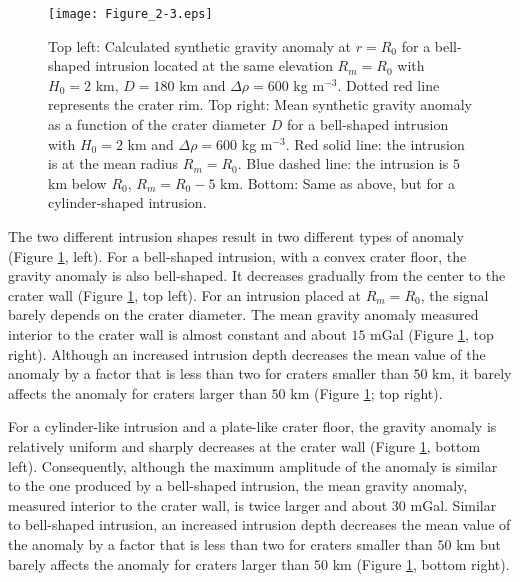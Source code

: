 \begin{figure}[h!]
  \graphicspath{ {/Users/thorey/Documents/These/Projet/FFC/Gravi_GRAIL/Article/Papier/Proof/} }
  \begin{center}
    \texttt{[image: Figure\_2-3.eps]}
    \caption{Top left:  Calculated synthetic gravity anomaly  at $r=R_0$
      for  a  bell-shaped  intrusion   located  at  the  same  elevation
      $R_m=R_0$ with $H_0 = 2$ km, $D  = 180$ km and $\Delta \rho = 600$
      kg m$^{-3}$. Dotted red line represents the crater rim. Top right:
      Mean  synthetic  gravity  anomaly  as a  function  of  the  crater
      diameter $D$  for a bell-shaped  intrusion with  $H_0 = 2$  km and
      $\Delta \rho = 600$ kg m$^{-3}$.  Red solid line: the intrusion is
      at the mean  radius $R_m=R_0$. Blue dashed line:  the intrusion is
      $5$ km below  $R_0$, $R_m = R_0-5$ km. Bottom:  Same as above, but
      for a cylinder-shaped intrusion.}
    \label{C6-Figure2-3}
  \end{center}



\end{figure}

The two  different intrusion shapes  result in two different  types of
anomaly   (Figure  \ref{C6-Figure2-3},   left).   For   a  bell-shaped
intrusion, with  a convex  crater floor, the  gravity anomaly  is also
bell-shaped.  It  decreases gradually  from the  center to  the crater
wall (Figure  \ref{C6-Figure2-3}, top left).  For  an intrusion placed
at $R_m=R_0$, the  signal barely depends on the  crater diameter.  The
mean gravity  anomaly measured interior  to the crater wall  is almost
constant and  about $15$ mGal (Figure  \ref{C6-Figure2-3}, top right).
Although an increased intrusion depth  decreases the mean value of the
anomaly by  a factor that  is less than  two for craters  smaller than
$50$ km, it barely affects the anomaly for craters larger than $50$ km
(Figure \ref{C6-Figure2-3}; top right).

For  a cylinder-like  intrusion  and a  plate-like  crater floor,  the
gravity anomaly  is relatively  uniform and  sharply decreases  at the
crater  wall  (Figure  \ref{C6-Figure2-3}, bottom  left).   Consequently,
although the  maximum amplitude of the  anomaly is similar to  the one
produced  by  a  bell-shaped  intrusion,  the  mean  gravity  anomaly,
measured interior to  the crater wall, is twice larger  and about $30$
mGal. Similar  to bell-shaped intrusion, an  increased intrusion depth
decreases the mean value of the anomaly  by a factor that is less than
two for  craters smaller than $50$  km but barely affects  the anomaly
for  craters  larger  than  $50$ km  (Figure  \ref{C6-Figure2-3},  bottom
right).
  
